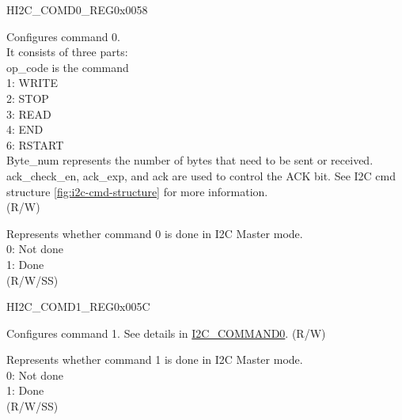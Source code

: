     \begin{register}{H}{I2C\_COMD0\_REG}{0x0058}\label{regdesc:I2CCOMD0REG}
    \regnewline%
    \begin{regdesc}\begin{reglist}
    \label{fielddesc:I2CCOMMAND0}\item [I2C\_COMMAND0] Configures command 0. \\
    It consists of three parts:\\
    op\_code is the command\\
    1: WRITE\\
    2: STOP\\
    3: READ\\
    4: END\\
    6: RSTART\\
    Byte\_num represents the number of bytes that need to be sent or received.\\
    ack\_check\_en, ack\_exp, and ack are used to control the ACK bit. See I2C cmd structure \ref{fig:i2c-cmd-structure} for more information. \\(R/W)
    \label{fielddesc:I2CCOMMAND0DONE}\item [I2C\_COMMAND0\_DONE] Represents whether command 0 is done in I2C Master mode.\\
    0: Not done \\
    1: Done \\ (R/W/SS)
    \end{reglist}\end{regdesc}
    \end{register}


    \begin{register}{H}{I2C\_COMD1\_REG}{0x005C}\label{regdesc:I2CCOMD1REG}
    \regnewline%
    \begin{regdesc}\begin{reglist}
    \label{fielddesc:I2CCOMMAND1}\item [I2C\_COMMAND1] Configures command 1. See details in \hyperref[fielddesc:I2CCOMMAND0]{I2C\_COMMAND0}. (R/W)
    \label{fielddesc:I2CCOMMAND1DONE}\item [I2C\_COMMAND1\_DONE] Represents whether command 1 is done in I2C Master mode.\\
    0: Not done \\
    1: Done \\ (R/W/SS)
    \end{reglist}\end{regdesc}
    \end{register}


